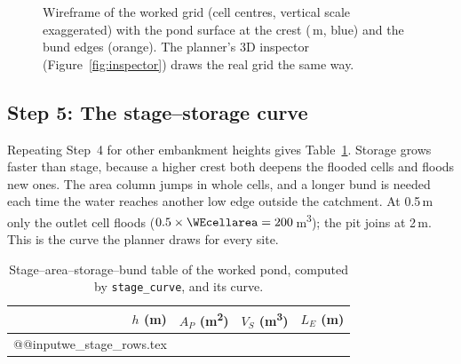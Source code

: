 \documentclass[11pt,a4paper]{article}
\makeatletter
\newcommand{\gen}[1]{}
\newcommand{\genrows}[1]{\csname @@input\endcsname\genpath#1 }
\newcommand{\code}[1]{\texttt{#1}}
\newcommand{\mthree}{m\textsuperscript{3}}
\newcommand{\mtwo}{m\textsuperscript{2}}
\makeatother
\begin{document}
\begin{figure}[htbp]
\centering
{}
\caption{Wireframe of the worked grid (cell centres, vertical scale exaggerated) with the pond surface at the crest (\WEcrest\,m, blue) and the bund edges (orange). The planner's 3D inspector (Figure~\ref{fig:inspector}) draws the real grid the same way.}
\label{fig:wire}
\end{figure}

\subsection*{Step 5: The stage--storage curve}
Repeating Step~4 for other embankment heights gives Table~\ref{tab:westage}. Storage grows faster than stage, because a higher crest both deepens the flooded cells and floods new ones. The area column jumps in whole cells, and a longer bund is needed each time the water reaches another low edge outside the catchment. At 0.5\,m only the outlet cell floods ($0.5\times\WEcellarea=200$\,\mthree{}); the pit joins at 2\,m. This is the curve the planner draws for every site.

\begin{table}[htbp]
\centering
\begin{minipage}[c]{0.44\linewidth}\centering\small
\begin{tabular}{@{}rrrr@{}}
\toprule
\textbf{$h$ (m)} & \textbf{$A_P$ (\mtwo)} & \textbf{$V_S$ (\mthree)} & \textbf{$L_E$ (m)}\\
\midrule
\genrows{we_stage_rows.tex}
\bottomrule
\end{tabular}
\end{minipage}\hfill
\begin{minipage}[c]{0.54\linewidth}\centering
{}
\end{minipage}
\caption{Stage--area--storage--bund table of the worked pond, computed by \code{stage\_curve}, and its curve.}
\label{tab:westage}
\end{table}
\end{document}
